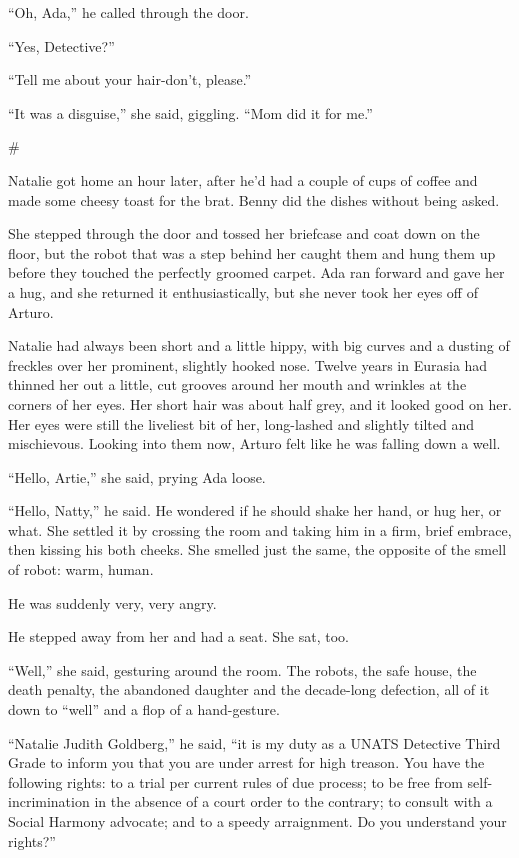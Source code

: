 “Oh, Ada,” he called through the door.

“Yes, Detective?”

“Tell me about your hair-don’t, please.”

“It was a disguise,” she said, giggling. “Mom did it for me.”

\#

Natalie got home an hour later, after he’d had a couple of cups of
coffee and made some cheesy toast for the brat. Benny did the
dishes without being asked.

She stepped through the door and tossed her briefcase and coat down
on the floor, but the robot that was a step behind her caught them
and hung them up before they touched the perfectly groomed carpet.
Ada ran forward and gave her a hug, and she returned it
enthusiastically, but she never took her eyes off of Arturo.

Natalie had always been short and a little hippy, with big curves
and a dusting of freckles over her prominent, slightly hooked nose.
Twelve years in Eurasia had thinned her out a little, cut grooves
around her mouth and wrinkles at the corners of her eyes. Her short
hair was about half grey, and it looked good on her. Her eyes were
still the liveliest bit of her, long-lashed and slightly tilted and
mischievous. Looking into them now, Arturo felt like he was falling
down a well.

“Hello, Artie,” she said, prying Ada loose.

“Hello, Natty,” he said. He wondered if he should shake her hand,
or hug her, or what. She settled it by crossing the room and taking
him in a firm, brief embrace, then kissing his both cheeks. She
smelled just the same, the opposite of the smell of robot: warm,
human.

He was suddenly very, very angry.

He stepped away from her and had a seat. She sat, too.

“Well,” she said, gesturing around the room. The robots, the safe
house, the death penalty, the abandoned daughter and the
decade-long defection, all of it down to “well” and a flop of a
hand-gesture.

“Natalie Judith Goldberg,” he said, “it is my duty as a UNATS
Detective Third Grade to inform you that you are under arrest for
high treason. You have the following rights: to a trial per current
rules of due process; to be free from self-incrimination in the
absence of a court order to the contrary; to consult with a Social
Harmony advocate; and to a speedy arraignment. Do you understand
your rights?”


